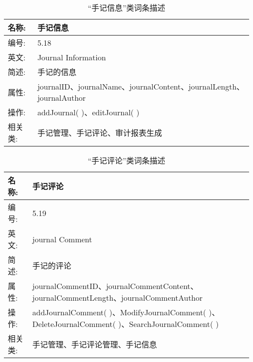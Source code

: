 \begin{table}[H]  
\caption{“手记信息”类词条描述}  
\begin{center}  
    \begin{tabular}{l p{11cm}} 
        \hline
        \quad 名称:  & 手记信息 \\
        \hline
        \quad 编号:  & 5.18 \\
        \hline
        \quad 英文:  &  Journal Information\\
        \hline
        \quad 简述:  & 手记的信息 \\
        \hline
        \quad 属性:  & journalID、journalName、journalContent、journalLength、journalAuthor \\
        \hline
        \quad 操作:  & addJournal( )、editJournal( )\\
        \hline
        \quad 相关类: & 手记管理、手记评论、审计报表生成\\
        \hline
    \end{tabular}
\end{center}
\end{table}

\begin{table}[H]  
\caption{“手记评论”类词条描述}  
\begin{center}  
    \begin{tabular}{l p{11cm}} 
        \hline
        \quad 名称:  & 手记评论 \\
        \hline
        \quad 编号:  & 5.19 \\
        \hline
        \quad 英文:  &  journal Comment\\
        \hline
        \quad 简述:  & 手记的评论 \\
        \hline
        \quad 属性:  & journalCommentID、journalCommentContent、journalCommentLength、journalCommentAuthor\\
        \hline
        \quad 操作:  & addJournalComment( )、ModifyJournalComment( )、DeleteJournalComment( )、SearchJournalComment( ) \\
        \hline
        \quad 相关类: & 手记管理、手记评论管理、手记信息\\
        \hline
    \end{tabular}
\end{center}
\end{table}


